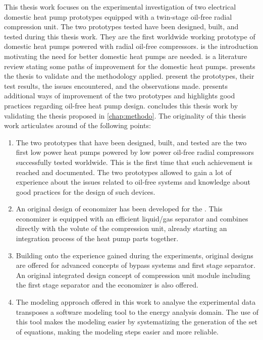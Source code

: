 This thesis work focuses on the experimental investigation of two
electrical domestic heat pump prototypes equipped with a twin-stage
oil-free radial compression unit. The two prototypes tested have been
designed, built, and tested during this thesis work. They are the
first worldwide working prototype of domestic heat pumps powered with
radial oil-free compressors.  is the introduction
motivating the need for better domestic heat pumps are
needed.  is a literature review stating some paths of
improvement for the domestic heat pumps.  presents
the thesis to validate and the methodology
applied.  present the prototypes, their test
results, the issues encountered, and the observations
made.  presents additional ways of improvement of
the two prototypes and highlights good practices regarding oil-free
heat pump design.  concludes this thesis work by
validating the thesis proposed in \cref{chap:methodo}. The originality
of this thesis work articulates around of the following points:

\begin{enumerate}
\item The two prototypes that have been designed, built, and tested
  are the two first low power heat pumps powered by low power oil-free
  radial compressors successfully tested worldwide. This is the first
  time that such achievement is reached and documented. The two prototypes allowed to gain a lot of experience about the
  issues related to oil-free systems and knowledge about good
  practices for the design of such devices.
\item An original design of economizer has been developed for the
  \AWP{}. This economizer is equipped with an efficient liquid/gas
  separator and combines directly with the volute of the compression
  unit, already starting an integration process of the heat pump parts
  together.
\item Building onto the experience gained during the experiments,
  original designs are offered for advanced concepts of bypass systems
  and first stage separator. An original integrated design concept of
  compression unit module including the first stage separator and the
  economizer is also offered.
\item The modeling approach offered in this work to analyse the experimental data transposes a software
  modeling tool to the energy analysis domain. The use of this tool
  makes the modeling easier by systematizing the generation of the set
  of equations, making the modeling steps easier and more reliable.
\end{enumerate}


